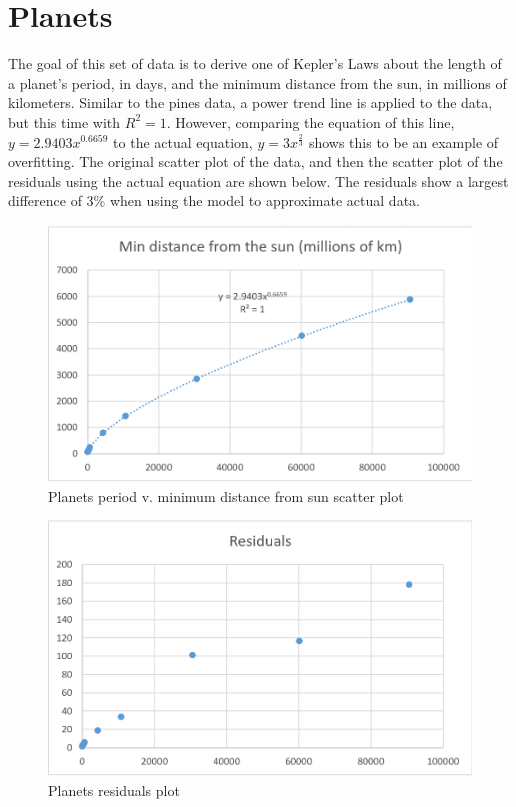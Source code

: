 \documentclass[12pt]{extarticle}
\begin{document}
\section{Planets}
The goal of this set of data is to derive one of Kepler's Laws about the length of a planet's period, in days, and the minimum distance from the sun, in millions of kilometers. Similar to the pines data, a power trend line is applied to the data, but this time with $R^2 = 1$. However, comparing the equation of this line, $y=2.9403x^{0.6659}$ to the actual equation, $y=3x^{\frac{2}{3}}$ shows this to be an example of overfitting. The original scatter plot of the data, and then the scatter plot of the residuals using the actual equation are shown below. The residuals show a largest difference of 3\% when using the model to approximate actual data.  
\begin{figure}[ht!]
  \includegraphics[width=\linewidth]{PlanetsScatter.PNG}
  \caption{Planets period v. minimum distance from sun scatter plot}
\end{figure}
\begin{figure}[ht!]
  \includegraphics[width=\linewidth]{PlanetsResiduals.PNG}
  \caption{Planets residuals plot}
\end{figure}
\end{document}
